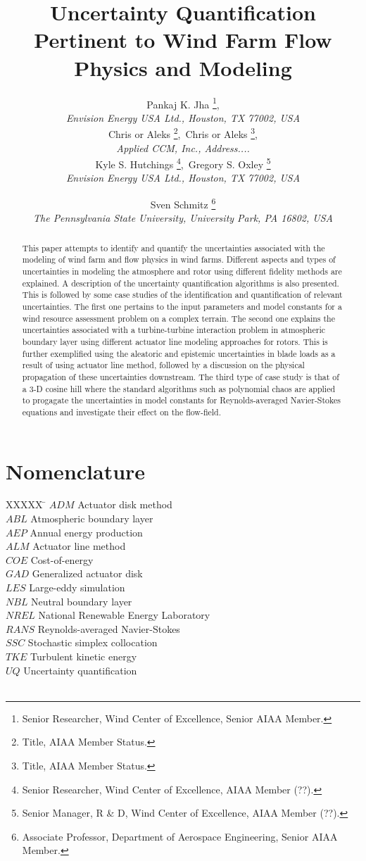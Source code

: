 \documentclass[]{aiaa-tc}%
\title{Uncertainty Quantification Pertinent to Wind Farm Flow Physics and Modeling}
\author{
    Pankaj K. Jha%
    \thanks{Senior Researcher, Wind Center of Excellence, Senior AIAA Member.},\\
   {\normalsize\itshape
   Envision Energy USA Ltd., Houston, TX 77002, USA}\\
    Chris or Aleks%
    \thanks{Title, AIAA Member Status.},\
    Chris or Aleks%
    \thanks{Title, AIAA Member Status.},\\
   {\normalsize\itshape
   Applied CCM, Inc., Address....}\\
    Kyle S. Hutchings%
   \thanks{Senior Researcher, Wind Center of Excellence, AIAA Member (??).},\
    Gregory S. Oxley%
   \thanks{Senior Manager, R \& D, Wind Center of Excellence, AIAA Member (??).}\\
  {\normalsize\itshape
   Envision Energy USA Ltd., Houston, TX 77002, USA}\\
  \and
  Sven Schmitz %
   \thanks{Associate Professor, Department of Aerospace Engineering, Senior AIAA Member.}\\
  {\normalsize\itshape
  The Pennsylvania State University, University Park, PA 16802, USA}
 }
\begin{document}
\maketitle

\begin{abstract}
This paper attempts to identify and quantify the uncertainties associated with the modeling of wind farm and flow physics in wind farms. Different aspects and types of uncertainties in modeling the atmosphere and rotor using different fidelity methods are explained. A description of the uncertainty quantification algorithms is also presented. This is followed by some case studies of the identification and quantification of relevant uncertainties. The first one pertains to the input parameters and model constants for a wind resource assessment problem on a complex terrain. The second one explains the uncertainties associated with a turbine-turbine interaction problem in atmospheric boundary layer using different actuator line modeling approaches for rotors. This is further exemplified using the aleatoric and epistemic uncertainties in blade loads as a result of using actuator line method, followed by a discussion on the physical propagation of these uncertainties downstream. The third type of case study is that of a 3-D cosine hill where the standard algorithms such as polynomial chaos are applied to progagate the uncertainties in model constants for Reynolds-averaged Navier-Stokes equations and investigate their effect on the flow-field.    
\end{abstract}

\section*{Nomenclature}

\begin{tabbing}
  XXXXX \= \kill%
  $ADM$ \> Actuator disk method \\
  $ABL$ \> Atmospheric boundary layer \\
  $AEP$ \> Annual energy production \\
  $ALM$ \> Actuator line method \\
  $COE$ \> Cost-of-energy \\
  $GAD$ \> Generalized actuator disk \\
  $LES$ \> Large-eddy simulation \\
  $NBL$ \> Neutral boundary layer \\
  $NREL$ \> National Renewable Energy Laboratory \\
  $RANS$ \> Reynolds-averaged Navier-Stokes \\
  $SSC$ \> Stochastic simplex collocation \\
  $TKE$ \> Turbulent kinetic energy \\
  $UQ$ \> Uncertainty quantification \\
  $$ \>
 \end{tabbing}
\end{document}
